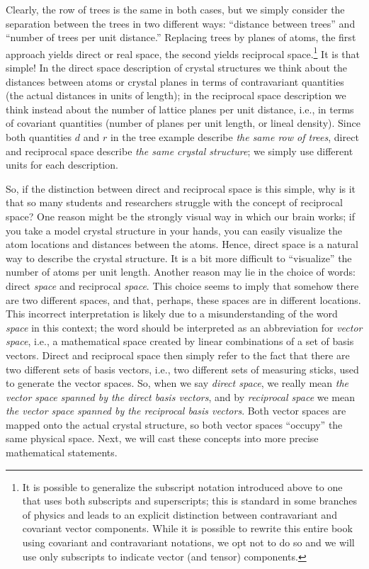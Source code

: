 Clearly, the row of trees is the same in both cases, but we simply consider the separation between the trees in two different ways: ``distance between trees'' and ``number of trees per unit distance.''  Replacing trees by planes of atoms, the first approach yields direct or real space, the second yields reciprocal space.\footnote{It is possible to generalize the subscript notation introduced above to one that uses both subscripts and superscripts; this is standard in some branches of physics and leads to an explicit distinction between contravariant and covariant vector components. While it is possible to rewrite this entire book using covariant and contravariant notations, we opt not to do so and we will use only subscripts to indicate vector (and tensor) components.}  It is that simple!   In the direct space description of crystal structures we think about the distances between atoms or crystal planes in terms of contravariant quantities (the actual distances in units of length); in the reciprocal space description we think instead about the number of lattice planes per unit distance, i.e., in terms of covariant quantities (number of planes per unit length, or lineal density).  Since both quantities $d$ and $r$ in the tree example describe \textit{the same row of trees}, direct and reciprocal space describe \textit{the same crystal structure}; we simply use different units for each description.  

So, if the distinction between direct and reciprocal space is this simple, why is it that so many students and researchers struggle with the concept of reciprocal space? One reason might be the strongly visual way in which our brain works; if you take a model crystal structure in your hands, you can easily visualize the atom locations and distances between the atoms. Hence, direct space is a natural way to describe the crystal structure.  It is a bit more difficult to ``visualize'' the number of atoms per unit length.  Another reason may lie in the choice of words: direct \textit{space} and reciprocal \textit{space}.  This choice seems to imply that somehow there are two different spaces, and that, perhaps, these spaces are in different locations.  This incorrect interpretation is likely due to a misunderstanding of the word \textit{space} in this context; the word should be interpreted as an abbreviation for \textit{vector space}, i.e., a mathematical space created by linear combinations of a set of basis vectors.  Direct and reciprocal space then simply refer to the fact that there are two different sets of basis vectors, i.e., two different sets of measuring sticks, used to generate the vector spaces. So, when we say \textit{direct space}, we really mean \textit{the vector space spanned by the direct basis vectors}, and by \textit{reciprocal space} we mean \textit{the vector space spanned by the reciprocal basis vectors}. Both vector spaces are mapped onto the actual crystal structure, so both vector spaces ``occupy'' the same physical space. Next, we will cast these concepts into more precise mathematical statements.


